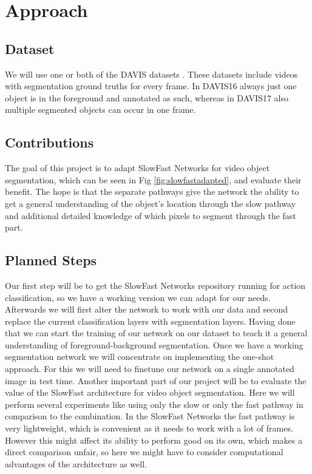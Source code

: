 \documentclass[conference]{IEEEtran}
\begin{document}
\section{Approach}
\subsection{Dataset}
We will use one or both of the DAVIS datasets \cite{davis_2016,davis_2017}. These datasets include videos with segmentation ground truths for every frame. In DAVIS16 always just one object is in the foreground and annotated as such, whereas in DAVIS17 also multiple segmented objects can occur in one frame. 
\subsection{Contributions}
The goal of this project is to adapt SlowFast Networks for video object segmentation, which can be seen in Fig \ref{fig:slowfastadapted}, and evaluate their benefit. The hope is that the separate pathways give the network the ability to get a general understanding of the object’s location through the slow pathway and additional detailed knowledge of which pixels to segment through the fast part.


\subsection{Planned Steps}
Our first step will be to get the SlowFast Networks repository running for action classification, so we have a working version we can adapt for our needs. Afterwards  we will first alter the network to work with our data and second replace the current classification layers with segmentation layers. Having done that we can start the training of our network on our dataset to teach it a general understanding of foreground-background segmentation.
Once we have a working segmentation network we will concentrate on implementing the one-shot approach. For this we will need to finetune our network on a single annotated image in test time.
Another important part of our project will be to evaluate the value of the SlowFast architecture for video object segmentation. Here we will perform several experiments like using only the slow or only the fast pathway in comparison to the combination. In the SlowFast Networks the fast pathway is very lightweight, which is convenient as it needs to work with a lot of frames. However this might affect its ability to perform good on its own, which makes a direct comparison unfair, so here we might have to consider computational advantages of the architecture as well.
\end{document}
